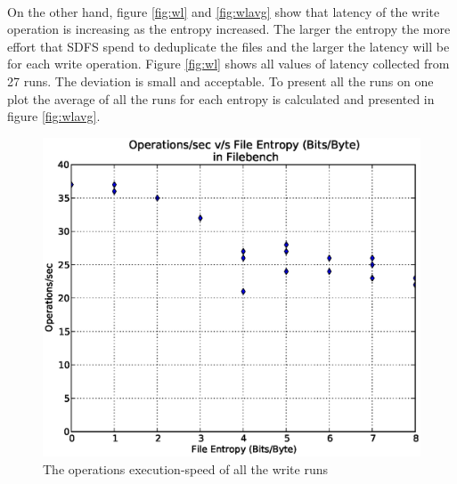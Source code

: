 \paragraph{}
On the other hand, figure \ref{fig:wl} and \ref{fig:wlavg} show that latency of the write operation is increasing as the entropy increased. The larger the entropy the more effort that SDFS spend to deduplicate the files and the larger the latency will be for each write operation. Figure \ref{fig:wl} shows all values of latency collected from 27 runs. The deviation is small and acceptable. To present all the runs on one plot the average of all the runs for each entropy is calculated and presented in figure \ref{fig:wlavg}.

\begin{figure}[H]
\begin{center}
\includegraphics[scale=.55]{../results/set1/write_ops_all.eps}
\caption{The operations execution-speed of all the write runs}
\label{fig:wops}
\end{center}
\end{figure}


